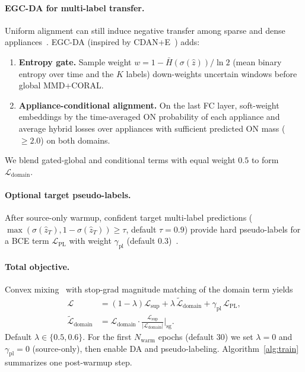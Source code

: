 \documentclass[journal]{IEEEtran}
\begin{document}
\paragraph{EGC-DA for multi-label transfer.}
Uniform alignment can still induce negative transfer among sparse and dense appliances~\cite{muaz2024when}.
EGC-DA (inspired by CDAN+E~\cite{long2018cdan}) adds:
\begin{enumerate}
\item \textbf{Entropy gate.} Sample weight
$w=1-\bar{H}(\sigma(\hat{z}))/\ln 2$ (mean binary entropy over time and the $K$ labels) down-weights uncertain windows before global MMD+CORAL.
\item \textbf{Appliance-conditional alignment.} On the last FC layer, soft-weight embeddings by the time-averaged ON probability of each appliance and average hybrid losses over appliances with sufficient predicted ON mass ($\ge 2.0$) on both domains.
\end{enumerate}
We blend gated-global and conditional terms with equal weight $0.5$ to form $\mathcal{L}_{\mathrm{domain}}$.

\paragraph{Optional target pseudo-labels.}
After source-only warmup, confident target multi-label predictions
($\max(\sigma(\hat{z}_T),1-\sigma(\hat{z}_T))\ge\tau$, default $\tau{=}0.9$)
provide hard pseudo-labels for a BCE term $\mathcal{L}_{\mathrm{PL}}$ with weight $\gamma_{\mathrm{pl}}$ (default $0.3$)~\cite{hur2022ssda}.

\paragraph{Total objective.}
Convex mixing~\cite{lin2022dda} with stop-grad magnitude matching of the domain term yields
\begin{equation}
\begin{aligned}
\mathcal{L}
&=
(1-\lambda)\mathcal{L}_{\mathrm{sup}}
+
\lambda\,\widetilde{\mathcal{L}}_{\mathrm{domain}}
+
\gamma_{\mathrm{pl}}\,\mathcal{L}_{\mathrm{PL}},
\\
\widetilde{\mathcal{L}}_{\mathrm{domain}}
&=
\mathcal{L}_{\mathrm{domain}}\cdot
\frac{\mathcal{L}_{\mathrm{sup}}}{|\mathcal{L}_{\mathrm{domain}}|}\Big|_{\mathrm{sg}}.
\end{aligned}
\label{eq:total}
\end{equation}
Default $\lambda\in\{0.5,0.6\}$.
For the first $N_{\mathrm{warm}}$ epochs (default $30$) we set $\lambda{=}0$ and $\gamma_{\mathrm{pl}}{=}0$ (source-only), then enable DA and pseudo-labeling.
Algorithm~\ref{alg:train} summarizes one post-warmup step.
\end{document}
